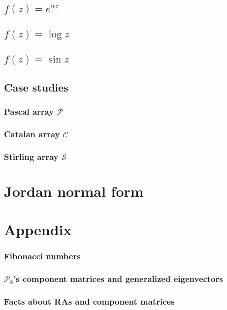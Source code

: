 

\subsection{$f(z)=e^{\alpha z}$}



\subsection{$f(z)=\log{z}$}



\subsection{$f(z)=\sin{z}$}



\subsection{Case studies}

\subsubsection{Pascal array $\mathcal{P}$}



\subsubsection{Catalan array $\mathcal{C}$}



\subsubsection{Stirling array $\mathcal{S}$}




\section{Jordan normal form}



\section{Appendix}

\subsubsection{Fibonacci numbers}



\subsubsection{$\mathcal{P}_{8}$'s component matrices and generalized eigenvectors}



\subsubsection{Facts about RAs and component matrices}






